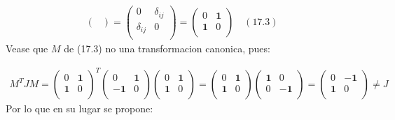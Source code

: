 \documentclass[a4paper]{article}
\begin{document}
\begin{answer}[Punto 3]
\begin{align*}
\begin{pmatrix}
            \end{pmatrix} = \begin{pmatrix}
                0 & \delta_{ij}\\
                \delta_{ij} & 0\\
            \end{pmatrix} = \begin{pmatrix}
                0 & \mathbf 1\\
                \mathbf 1 & 0\\
            \end{pmatrix} \quad (17.3)
        \end{align*}
        Vease que $M$ de (17.3) no una transformacion canonica, pues:

        \begin{align*}
            M^T J M = \begin{pmatrix}
                0 & \mathbf 1\\
                \mathbf 1 & 0\\
            \end{pmatrix}^T \begin{pmatrix}
                0 & \mathbf 1\\
                -\mathbf 1 & 0\\
            \end{pmatrix} \begin{pmatrix}
                0 & \mathbf 1\\
                \mathbf 1 & 0\\
            \end{pmatrix}
            = \begin{pmatrix}
                0 & \mathbf 1\\
                \mathbf 1 & 0\\
            \end{pmatrix} \begin{pmatrix}
                \mathbf 1 & 0\\
                0 & -\mathbf 1\\
            \end{pmatrix} = \begin{pmatrix}
                0 & -\mathbf 1\\
                \mathbf 1 & 0\\
            \end{pmatrix} \not = J
        \end{align*}
        Por lo que en su lugar se propone:

\end{answer}
\end{document}
